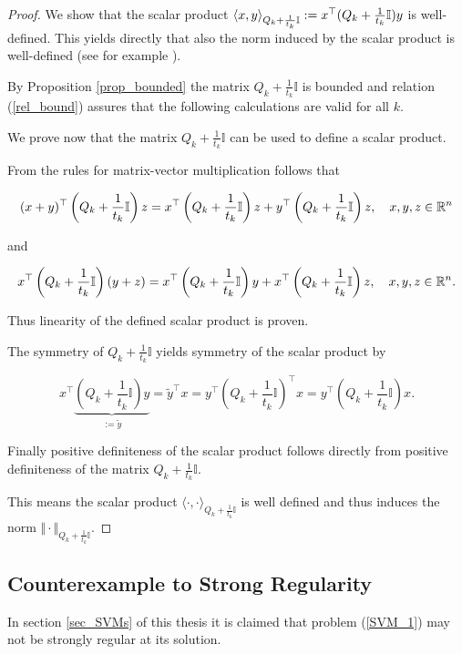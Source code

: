 \begin{proof}
	We show that the scalar product \(\left\langle x,y \right\rangle_{Q_k+\frac{1}{t_k}\mathbb{I}} := x^{\top} (Q_k+\frac{1}{t_k}\mathbb{I})y\) is well-defined.
	This yields directly that also the norm induced by the scalar product is well-defined (see for example \cite[Corollary 12.6, p. 172]{Liesen2015}).
	
	By Proposition \ref{prop_bounded} the matrix \(Q_k+\frac{1}{t_k}\mathbb{I}\) is bounded and relation (\ref{rel_bound}) assures that the following calculations are valid for all \(k\).
	
	We prove now that the matrix \(Q_k+\frac{1}{t_k}\mathbb{I}\) can be used to define a scalar product.
	
From the rules for matrix-vector multiplication follows that

\[ (x+y)^{\top}\left(Q_k+\frac{1}{t_k}\mathbb{I}\right)z = x^{\top}\left(Q_k+\frac{1}{t_k}\mathbb{I}\right)z + y^{\top}\left(Q_k+\frac{1}{t_k}\mathbb{I}\right)z, \quad x,y,z \in \mathbb{R}^n\]

and 

\[ x^{\top}\left(Q_k+\frac{1}{t_k}\mathbb{I}\right)(y+z) = x^{\top}\left(Q_k+\frac{1}{t_k}\mathbb{I}\right)y + x^{\top}\left(Q_k+\frac{1}{t_k}\mathbb{I}\right)z, \quad x,y,z \in \mathbb{R}^n.\]

Thus linearity of the defined scalar product is proven.

The symmetry of \(Q_k+\frac{1}{t_k}\mathbb{I}\) yields symmetry of the scalar product by

\[ x^{\top} \underbrace{\left(Q_k+\frac{1}{t_k}\mathbb{I}\right)y}_{:=\tilde{y}} = \tilde{y}^{\top}x = y^{\top}\left(Q_k+\frac{1}{t_k}\mathbb{I}\right)^{\top}x = y^{\top}\left(Q_k+\frac{1}{t_k}\mathbb{I}\right)x.   \]

Finally positive definiteness of the scalar product follows directly from positive definiteness of the matrix \(Q_k+\frac{1}{t_k}\mathbb{I}\).

This means the scalar product \(\langle \cdot,\cdot \rangle_{Q_k+\frac{1}{t_k}\mathbb{I}}\) is well defined and thus induces the norm \(\Vert \cdot \Vert_{Q_k+\frac{1}{t_k}\mathbb{I}}\).
\end{proof}

\subsection{Counterexample to Strong Regularity}
\label{sec_counter_ex}
In section \ref{sec_SVMs} of this thesis it is claimed that problem (\ref{SVM_1}) may not be strongly regular at its solution.

